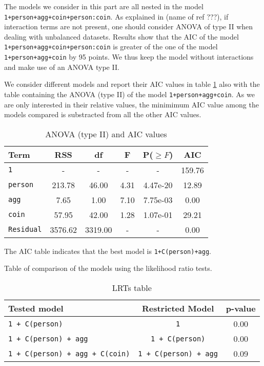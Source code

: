 \documentclass[a4paper, 12pt,oneside]{article}
\begin{document}
			The models we consider in this part are all nested in the model \texttt{1+person+agg+coin+person:coin}. As explained in (name of ref ???), if interaction terms are not present, one should consider ANOVA of type II when dealing with unbalanced datasets. Results show that the AIC of the model \texttt{1+person+agg+coin+person:coin} is greater of the one of the model \texttt{1+person+agg+coin} by 95 points. We thus keep the model without interactions and make use of an ANOVA type II. 
			
			We consider different models and report their AIC values in table \ref{tab:WLS_AIC} also with the table containing the ANOVA (type II) of the model \texttt{1+person+agg+coin}. As we are only interested in their relative values, the minimimum AIC value among the models compared is substracted from all the other AIC values. 
			\begin{table}[htb]
				\centering
				\caption{ANOVA (type II) and AIC values}
				\label{tab:WLS_AIC}
				\begin{tabular}{lccccc}
				\toprule
				Term & RSS & df & F & P($\ge F$) & AIC \\
				\midrule
				\texttt{1} & - & - & - & - & 159.76  \\
				\texttt{person} & 213.78 & 46.00 & 4.31 & 4.47e-20 & 12.89 \\
				\texttt{agg} & 7.65 & 1.00 & 7.10 & 7.75e-03 & 0.00 \\
				\texttt{coin} & 57.95 & 42.00 & 1.28 & 1.07e-01 & 29.21 \\
				\texttt{Residual} & 3576.62 & 3319.00 & - & - & 0.00 \\
				\bottomrule
				\end{tabular}
			\end{table}

			The AIC table indicates that the best model is \texttt{1+C(person)+agg}. 

			Table of comparison of the models using the likelihood ratio tests. 

			\begin{table}[htb]
				\centering
				\caption{LRTs table}
				\label{tab:WLS_LRT}
				\begin{tabular}{lcc}
				\toprule
				Tested model & Restricted Model & p-value \\
				\midrule
				\texttt{1 + C(person)} & \texttt{1} & 0.00 \\
				\texttt{1 + C(person) + agg} & \texttt{1 + C(person)} & 0.00 \\
				\texttt{1 + C(person) + agg + C(coin)} & \texttt{1 + C(person) + agg} & 0.09 \\
				\bottomrule
				\end{tabular}
				\end{table}
\end{document}
